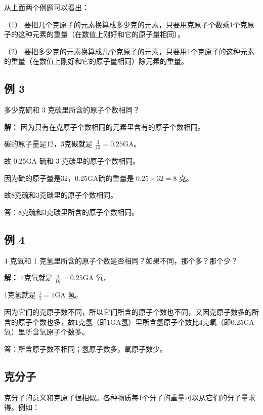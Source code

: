 从上面两个例题可以看出：

（1）
要把几个克原子的元素换算成多少克的元素，只要用克原子个数乘1个克原子的这种元素的重量（在数值上刚好和它的原子量相同）。

（2）
要把多少克的元素换算成几个克原子的元素，只要用1个克原子的这种元素的重量（在数值上刚好和它的原子量相同）除元素的重量。

\subsection{例 3}

多少克硫和 3 克碳里所含的原子个数相同？

\textbf{解：} 因为只有在克原子个数相同的元素里含有的原子个数相同。

碳的原子量是12，3克碳就是 \(\frac{3}{12} = 0.25\mathrm{GA}\)。

故 0.25GA 硫和 3 克碳里的原子个数相同。

因为硫的原子量是32，0.25GA硫的重量是 \(0.25 \times 32 = 8\) 克。

故8克硫和3克碳里的原子个数相同。

答：8克硫和3克碳里所含的原子个数相同。

\subsection{例 4}

4 克氧和 1 克氢里所含的原子个数是否相同？如果不同，那个多？那个少？

\textbf{解：} 4克氧就是 \(\frac{4}{16} = 0.25\mathrm{GA}\) 氧，

1克氢就是 \(\frac{1}{1} = 1\mathrm{GA}\) 氢。

因为它们的克原子数不同，所以它们所含的原子个数也不同，又因克原子数多的所含的原子个数也多，故1克氢（即1GA氢）里所含氢原子个数比4克氧（即0.25GA氧）里所含氧原子个数多。

答：所含原子数不相同；氢原子数多，氧原子数少。

\subsection{克分子}

克分子的意义和克原子很相似。各种物质每1个分子的重量可以从它们的分子量求得。例如：


